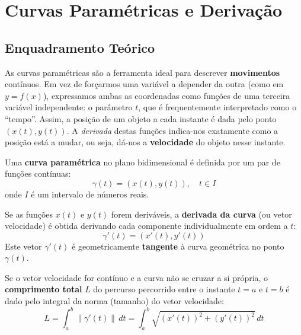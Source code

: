 
\section{Curvas Paramétricas e Derivação}

\subsection{Enquadramento Teórico}

\begin{notebox}[title={Intuição Geral}]
  As curvas paramétricas são a ferramenta ideal para descrever \textbf{movimentos} contínuos. Em vez de forçarmos uma variável a depender da outra (como em $y = f(x)$), expressamos ambas as coordenadas como funções de uma terceira variável independente: o parâmetro $t$, que é frequentemente interpretado como o ``tempo''.
  Assim, a posição de um objeto a cada instante é dada pelo ponto $(x(t), y(t))$. A \emph{derivada} destas funções indica-nos exatamente como a posição está a mudar, ou seja, dá-nos a \textbf{velocidade} do objeto nesse instante.
\end{notebox}

\begin{defbox}[title={Curva Paramétrica e Vetor Velocidade}]
  Uma \textbf{curva paramétrica} no plano bidimensional é definida por um par de funções contínuas:
  \[
    \gamma(t) = (x(t), y(t)), \quad t \in I
  \]
  onde $I$ é um intervalo de números reais.
  
  Se as funções $x(t)$ e $y(t)$ forem deriváveis, a \textbf{derivada da curva} (ou vetor velocidade) é obtida derivando cada componente individualmente em ordem a $t$:
  \[
    \gamma'(t) = (x'(t), y'(t))
  \]
  Este vetor $\gamma'(t)$ é geometricamente \textbf{tangente} à curva geométrica no ponto $\gamma(t)$.
\end{defbox}

\begin{defbox}[title={Comprimento de uma Curva (Arco)}]
  Se o vetor velocidade for contínuo e a curva não se cruzar a si própria, o \textbf{comprimento total} $L$ do percurso percorrido entre o instante $t=a$ e $t=b$ é dado pelo integral da norma (tamanho) do vetor velocidade:
  \[
    L = \int_a^b \|\gamma'(t)\| \,dt = \int_a^b \sqrt{(x'(t))^2 + (y'(t))^2} \,dt
  \]
\end{defbox}

